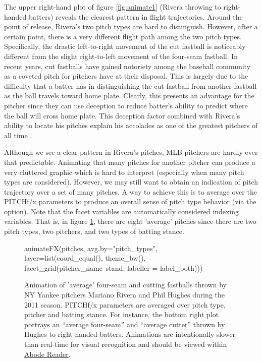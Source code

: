 \begin{article}
The upper right-hand plot of figure \ref{fig:animate1} (Rivera throwing
to right-handed batters) reveals the clearest pattern in flight trajectories.
Around the point of release, Rivera's two pitch types are hard to
distinguish. However, after a certain point, there is a very different
flight path among the two pitch types. Specifically, the drastic left-to-right
movement of the cut fastball is noticeably different from the slight
right-to-left movement of the four-seam fastball. In recent years,
cut fastballs have gained notoriety among the baseball community as
a coveted pitch for pitchers have at their disposal. This is largely
due to the difficulty that a batter has in distinguishing the cut
fastball from another fastball as the ball travels toward home plate.
Clearly, this presents an advantage for the pitcher since they can
use deception to reduce batter's ability to predict where the ball
will cross home plate. This deception factor combined with Rivera's
ability to locate his pitches explain his accolades as one of the
greatest pitchers of all time \citet{NYT}.

Although we see a clear pattern in Rivera's pitches, MLB pitchers
are hardly ever that predictable. Animating that many pitches for
another pitcher can produce a very cluttered graphic which is hard
to interpret (especially when many pitch types are considered). However,
we may still want to obtain an indication of pitch trajectory over
a set of many pitches. A way to achieve this is to average over the
PITCHf/x parameters to produce an overall sense of pitch type behavior
(via the  option). Note that the facet variables are
automatically considered indexing variables. That is, in figure \ref{fig:animate2},
there are eight 'average' pitches since there are two pitch types,
two pitchers, and two types of batting stance. 
\begin{figure}[h]
\begin{Schunk}
\begin{Sinput}
animateFX(pitches, avg.by="pitch_types", layer=list(coord_equal(), theme_bw(),
	facet_grid(pitcher_name~stand, labeller = label_both)))
\end{Sinput}

\end{Schunk}


\caption{\label{fig:animate2}Animation of 'average' four-seam and cutting
fastballs thrown by NY Yankee pitchers Mariano Rivera and Phil Hughes
during the 2011 season. PITCHf/x parameters are averaged over pitch
type, pitcher and batting stance. For instance, the bottom right plot
portrays an ``average four-seam'' and ``average cutter'' thrown
by Hughes to right-handed batters. Animations are intentionally slower
than real-time for visual recognition and should be viewed within
\protect\href{http://get.adobe.com/reader/}{Abode Reader}.}
\end{figure}




\end{article}
